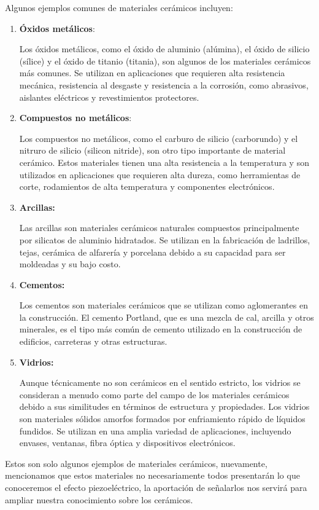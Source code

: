 \documentclass[12pt]{article}
\begin{document}
Algunos ejemplos comunes de materiales cerámicos incluyen:
\begin{enumerate}
\item \textbf{Óxidos metálicos}:

Los óxidos metálicos, como el óxido de aluminio (alúmina), el óxido de silicio (sílice) y el óxido de titanio (titania), son algunos de los materiales cerámicos más comunes. Se utilizan en aplicaciones que requieren alta resistencia mecánica, resistencia al desgaste y resistencia a la corrosión, como abrasivos, aislantes eléctricos y revestimientos protectores.
\item \textbf{Compuestos no metálicos}:

Los compuestos no metálicos, como el carburo de silicio (carborundo) y el nitruro de silicio (silicon nitride), son otro tipo importante de material cerámico. Estos materiales tienen una alta resistencia a la temperatura y son utilizados en aplicaciones que requieren alta dureza, como herramientas de corte, rodamientos de alta temperatura y componentes electrónicos.
\item \textbf{Arcillas:}

Las arcillas son materiales cerámicos naturales compuestos principalmente por silicatos de aluminio hidratados. Se utilizan en la fabricación de ladrillos, tejas, cerámica de alfarería y porcelana debido a su capacidad para ser moldeadas y su bajo costo.
\item \textbf{Cementos:}

Los cementos son materiales cerámicos que se utilizan como aglomerantes en la construcción. El cemento Portland, que es una mezcla de cal, arcilla y otros minerales, es el tipo más común de cemento utilizado en la construcción de edificios, carreteras y otras estructuras.
\item \textbf{Vidrios:}

Aunque técnicamente no son cerámicos en el sentido estricto, los vidrios se consideran a menudo como parte del campo de los materiales cerámicos debido a sus similitudes en términos de estructura y propiedades. Los vidrios son materiales sólidos amorfos formados por enfriamiento rápido de líquidos fundidos. Se utilizan en una amplia variedad de aplicaciones, incluyendo envases, ventanas, fibra óptica y dispositivos electrónicos.
\end{enumerate}

Estos son solo algunos ejemplos de materiales cerámicos, nuevamente, mencionamos que estos materiales no necesariamente todos presentarán lo que conoceremos el efecto piezoeléctrico, la aportación de señalarlos nos servirá para ampliar nuestra conocimiento sobre los cerámicos.
\end{document}
